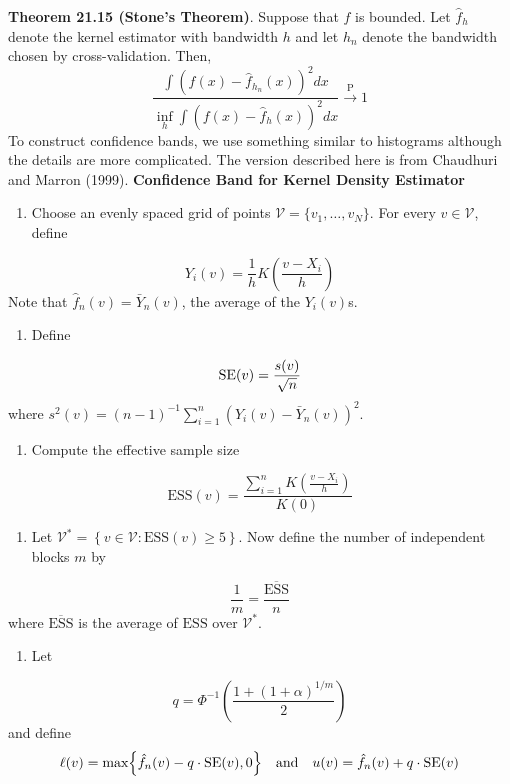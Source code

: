 \textbf{Theorem 21.15 (Stone's Theorem)}. Suppose that \(f\) is bounded. Let \(\hat{f}_h\) denote the kernel estimator with bandwidth \(h\) and let \(h_{n}\) denote the bandwidth chosen by cross-validation. Then,
\[
\frac{\int \left( f(x) - \hat{f}_{h_{n}}(x)\right)^{2} dx}{\inf_h \int \left( f(x) - \hat{f}_h(x) \right)^{2} dx} \xrightarrow{\textrm{P}} 1
\]
To construct confidence bands, we use something similar to histograms although the details are more complicated. The version described here is from Chaudhuri and Marron (1999).
\textbf{Confidence Band for Kernel Density Estimator}
\begin{enumerate}[tightlist,label={\arabic*.}]
\item
  Choose an evenly spaced grid of points
  \(\mathcal{V} = \{ v_{1}, \dots, v_N \}\). For every
  \(v \in \mathcal{V}\), define
\end{enumerate}
\[
Y_{i}(v) = \frac{1}{h} K \left( \frac{v - X_{i}}{h} \right)
\]
Note that \(\hat{f}_{n}(v) = \bar{Y}_{n}(v)\), the average of the
\(Y_{i}(v)\)s.
\begin{enumerate}[tightlist,label={\arabic*.}]
\item
  Define
\end{enumerate}
\[
\operatorname{\mathrm{SE}} (v) = \frac{s(v)}{\sqrt{n}}
\]
where
\(s^{2}(v) = (n - 1)^{-1} \sum_{i=1}^{n} ( Y_{i}(v) - \bar{Y}_{n}(v) )^{2}\).
\begin{enumerate}[tightlist,label={\arabic*.},resume]
\item
  Compute the effective sample size
\end{enumerate}
\[
\text{ESS}(v) = \frac{\sum_{i=1}^{n} K\left( \frac{v - X_{i}}{h} \right)}{K(0)}
\]
\begin{enumerate}[tightlist,label={\arabic*.},resume]
\item
  Let
  \(\mathcal{V}^{*} = \left\{ v \in \mathcal{V} : \text{ESS}(v) \geq 5 \right\}\).
  Now define the number of independent blocks \(m\) by
\end{enumerate}
\[
\frac{1}{m} = \frac{\overline{\text{ESS}}}{n}
\]
where \(\overline{\text{ESS}}\) is the average of \(\text{ESS}\) over
\(\mathcal{V}^{*}\).
\begin{enumerate}[tightlist,label={\arabic*.},resume]
\item
  Let
\end{enumerate}
\[
q = \Phi^{-1} \left( \frac{1 + (1 + \alpha)^{1/m}}{2} \right)
\]
and define
\[
\ell(v) = \text{max} \left\{ \hat{f}_{n}(v) - q \cdot \SE (v), 0 \right\}
\quad \text{and} \quad
u(v) = \hat{f}_{n}(v) + q \cdot \SE (v)
\]
